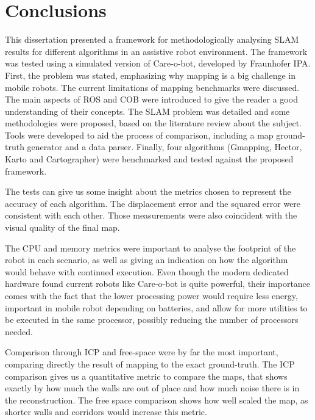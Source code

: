 \chapter{Conclusions}\label{chp:conclusoes}


This dissertation presented a framework for methodologically analysing SLAM results for different algorithms in an assistive robot environment. The framework was tested using a simulated version of Care-o-bot, developed by Fraunhofer IPA. First, the problem was stated, emphasizing why mapping is a big challenge in mobile robots. The current limitations of mapping benchmarks were discussed. The main aspects of ROS and COB were introduced to give the reader a good understanding of their concepts. The SLAM problem was detailed and some methodologies were proposed, based on the literature review about the subject. Tools were developed to aid the process of comparison, including a map ground-truth generator and a data parser. Finally, four algorithms (Gmapping, Hector, Karto and Cartographer) were benchmarked and tested against the proposed framework.

The tests can give us some insight about the metrics chosen to represent the accuracy of each algorithm. The displacement error and the squared error were consistent with each other. Those measurements were also coincident with the visual quality of the final map.

The CPU and memory metrics were important to analyse the footprint of the robot in each scenario, as well as giving an indication on how the algorithm would behave with continued execution. Even though the modern dedicated hardware found current robots like Care-o-bot is quite powerful, their importance comes with the fact that the lower processing power would require less energy, important in mobile robot depending on batteries, and allow for more utilities to be executed in the same processor, possibly reducing the number of processors needed.

Comparison through ICP and free-space were by far the most important, comparing directly the result of mapping to the exact ground-truth. The ICP comparison gives us a quantitative metric to compare the maps, that shows exactly by how much the walls are out of place and how much noise there is in the reconstruction. The free space comparison shows how well scaled the map, as shorter walls and corridors would increase this metric.

